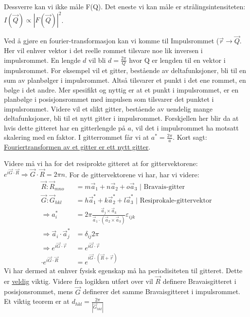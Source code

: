 \documentclass{article}
\begin{document}
Dessverre kan vi ikke måle F(Q). Det eneste vi kan måle er strålingsintensiteten: $I(\vec{Q}) \propto |F(\vec{Q})|^2$.

Ved å gjøre en fourier-transformasjon kan vi komme til Impulsrommet ($\vec{r} \rightarrow \vec{Q}$. Her vil enhver vektor i det reelle rommet tilsvare noe lik inversen i impulsrommet. En lengde $d$ vil bli $d = \frac{2 \pi}{Q}$ hvor Q er lengden til en vektor i impulsrommet. For eksempel vil et gitter, bestående av deltafunksjoner, bli til en sum av planbølger i impulsrommet. Altså tilsvarer et punkt i det ene rommet, en bølge i det andre. Mer spesifikt og nyttig er at et punkt i impulsrommet, er en planbølge i posisjonsrommet med impulsen som tilsvarer det punktet i impulsrommet. Videre vil et slikt gitter, bestående av uendelig mange deltafunksjoner, bli til et nytt gitter i impulsrommet. Forskjellen her blir da at hvis dette gitteret har en gitterlengde på $a$, vil det i impulsrommet ha motsatt skalering med en faktor. I gitterrommet får vi at $a^{*} = \frac{2\pi}{a}$. Kort sagt:
\underline{Fouriertransformen av et gitter er ett nytt gitter}.

Videre må vi ha for det resiprokte gitteret at for gittervektorene: $e^{i \vec{G} \cdot \vec{R}} \Rightarrow \vec{G} \cdot \vec{R} = 2 \pi n$. For de gittervektorene vi har, har vi videre:
\begin{align*}
    \vec{R}: \vec{R}_{mno} &= m \vec{a}_1 + n\vec{a}_2 + o \vec{a}_3 \text{  | Bravais-gitter} \\
\vec{G}: \vec{G}_{hkl} &= h \vec{a}^{*}_1 + k\vec{a}^{*}_2 + l\vec{a}^{*}_3 \text{  | Resiprokale-gittervektor} \\
\Rightarrow a_i^{*} &= 2 \pi \frac{\vec{a}_j \times \vec{a}_k}{\vec{a}_1 \cdot (\vec{a}_2 \times \vec{a}_3)} \varepsilon_{ijk} \\
\Rightarrow \vec{a}_i \cdot \vec{a}^{*}_{j} &= \delta_{ij} 2 \pi \\
\Rightarrow e^{i \vec{G} \cdot \vec{r}} &= e^{i \vec{G} \cdot \vec{r}} \\\cdot e^{i \vec{G} \cdot \vec{R}} &= e^{i \vec{G} \cdot(\vec{R} + \vec{r})}
\end{align*}
Vi har dermed at enhver fysisk egenskap må ha periodisiteten til gitteret. Dette er \underline{veldig} viktig. Videre fra logikken utført over vil $\vec{R}$ definere Bravaisgitteret i posisjonsrommet, mens $\vec{G}$ definerer det samme Bravaisgitteret i impulsrommet. Et viktig teorem er at $d_{hkl} = \frac{2\pi}{|\vec{G}_{hkl}|}$
\end{document}
